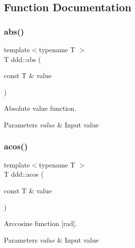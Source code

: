 \subsection{Function Documentation}
\mbox{\label{namespaceddd_a9ac20d4240d0a9fa208e3dd220101a0a}} 
\subsubsection{\texorpdfstring{abs()}{abs()}}
{\footnotesize\ttfamily template$<$typename T $>$ \\
T ddd\+::abs (\begin{DoxyParamCaption}\item[{const T \&}]{value }\end{DoxyParamCaption})\hspace{0.3cm}{\ttfamily [inline]}}



Absolute value function. 


\begin{DoxyParams}{Parameters}
{\em value} & Input value \\
\hline
\end{DoxyParams}
\mbox{\label{namespaceddd_a03e440b351f44fec5abac1270231e3bb}} 
\subsubsection{\texorpdfstring{acos()}{acos()}}
{\footnotesize\ttfamily template$<$typename T $>$ \\
T ddd\+::acos (\begin{DoxyParamCaption}\item[{const T \&}]{value }\end{DoxyParamCaption})\hspace{0.3cm}{\ttfamily [inline]}}



Arccosine function \mbox{[}rad\mbox{]}. 


\begin{DoxyParams}{Parameters}
{\em value} & Input value \\
\hline
\end{DoxyParams}
\mbox{\label{namespaceddd_af887d6f09da2128f99b36b034ab2ed1f}} 
